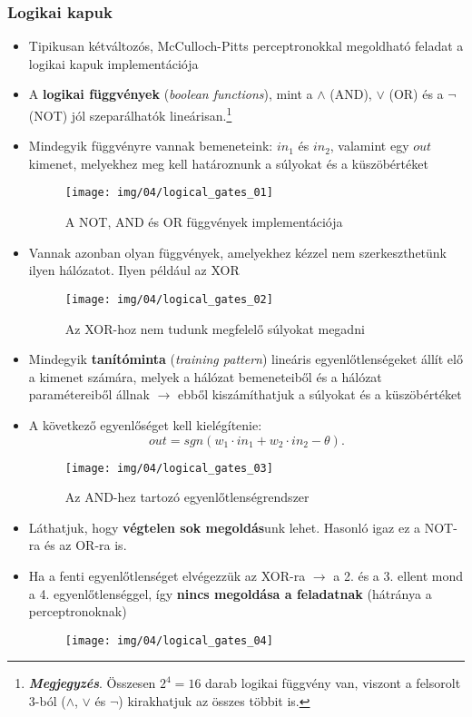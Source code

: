 \documentclass[a4paper, 11pt]{article}
\begin{document}
\subsubsection{Logikai kapuk}

\begin{itemize}
	\item Tipikusan kétváltozós, McCulloch-Pitts perceptronokkal megoldható feladat a logikai kapuk implementációja
	
	\item A \textbf{logikai függvények} (\textit{boolean functions}), mint a $\land$ (AND), $\lor$ (OR) és a $\neg$ (NOT) jól szeparálhatók lineárisan.\footnote{\textbf{\textit{Megjegyzés}}. Összesen $2^4 = 16$ darab logikai függvény van, viszont a felsorolt 3-ból ($\land$, $\lor$ és $\neg$) kirakhatjuk az összes többit is.}
	\item Mindegyik függvényre vannak bemeneteink: $in_1$ és $in_2$, valamint egy $out$ kimenet, melyekhez meg kell határoznunk a súlyokat és a küszöbértéket
	\begin{figure}[h!]
		\centering
		\texttt{[image: img/04/logical\_gates\_01]}
	
		\caption{A NOT, AND és OR függvények implementációja}
	\end{figure}
	
	
	\item Vannak azonban olyan függvények, amelyekhez kézzel nem szerkeszthetünk ilyen hálózatot. Ilyen például az XOR
	\begin{figure}[h!]
		\centering
		\texttt{[image: img/04/logical\_gates\_02]}
		
		\caption{Az XOR-hoz nem tudunk megfelelő súlyokat megadni}
	\end{figure}

	\item Mindegyik \textbf{tanítóminta} (\textit{training pattern}) lineáris egyenlőtlenségeket állít elő a kimenet számára, melyek a hálózat bemeneteiből és a hálózat paramétereiből állnak $\to$ ebből kiszámíthatjuk a súlyokat és a küszöbértéket
	\item A következő egyenlőséget kell kielégítenie: \[ out = sgn(w_1 \cdot in_1 + w_2 \cdot in_2 - \theta). \]
	\begin{figure}[h!]
		\centering
		\texttt{[image: img/04/logical\_gates\_03]}
		\caption{Az AND-hez tartozó egyenlőtlenségrendszer}
	\end{figure}
	\item Láthatjuk, hogy \textbf{végtelen sok megoldás}unk lehet. Hasonló igaz ez a NOT-ra és az OR-ra is.
	\item Ha a fenti egyenlőtlenséget elvégezzük az XOR-ra $\to$ a 2. és a 3. ellent mond a 4. egyenlőtlenséggel, így \textbf{nincs megoldása a feladatnak} (hátránya a perceptronoknak)
	\begin{figure}[h!]
		\centering
		\texttt{[image: img/04/logical\_gates\_04]}
		

\end{figure}
\end{itemize}
\end{document}
